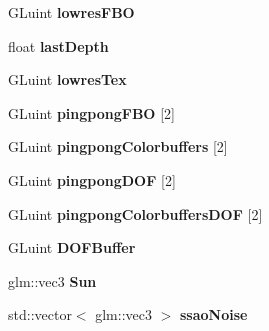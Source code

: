 \begin{DoxyCompactItemize}
\item 
G\+Luint {\bfseries lowres\+F\+BO}\hypertarget{class_post_process_a49a53d8a3ea6bd18eb455fe52de5dda2}{}\label{class_post_process_a49a53d8a3ea6bd18eb455fe52de5dda2}

\item 
float {\bfseries last\+Depth}\hypertarget{class_post_process_a3abc05d2892f0bfd536252612ce69e24}{}\label{class_post_process_a3abc05d2892f0bfd536252612ce69e24}

\item 
G\+Luint {\bfseries lowres\+Tex}\hypertarget{class_post_process_ae680a89b400e4530f570f74fc8b48b65}{}\label{class_post_process_ae680a89b400e4530f570f74fc8b48b65}

\item 
G\+Luint {\bfseries pingpong\+F\+BO} \mbox{[}2\mbox{]}\hypertarget{class_post_process_a2adb4ea7ba61d31a0facac5f69b062bc}{}\label{class_post_process_a2adb4ea7ba61d31a0facac5f69b062bc}

\item 
G\+Luint {\bfseries pingpong\+Colorbuffers} \mbox{[}2\mbox{]}\hypertarget{class_post_process_a7118702a4e3ccab9694a0754aa778c0e}{}\label{class_post_process_a7118702a4e3ccab9694a0754aa778c0e}

\item 
G\+Luint {\bfseries pingpong\+D\+OF} \mbox{[}2\mbox{]}\hypertarget{class_post_process_a0bb0221084bd5c1e1455b32489dddc05}{}\label{class_post_process_a0bb0221084bd5c1e1455b32489dddc05}

\item 
G\+Luint {\bfseries pingpong\+Colorbuffers\+D\+OF} \mbox{[}2\mbox{]}\hypertarget{class_post_process_a7aa3bb2fca1e8ef8a877a4f06316aea8}{}\label{class_post_process_a7aa3bb2fca1e8ef8a877a4f06316aea8}

\item 
G\+Luint {\bfseries D\+O\+F\+Buffer}\hypertarget{class_post_process_a443ab6ff49c01a284eff21cf51a0b6b7}{}\label{class_post_process_a443ab6ff49c01a284eff21cf51a0b6b7}

\item 
glm\+::vec3 {\bfseries Sun}\hypertarget{class_post_process_a0d4bc1dee1128ff4e35cb2504f891780}{}\label{class_post_process_a0d4bc1dee1128ff4e35cb2504f891780}

\item 
std\+::vector$<$ glm\+::vec3 $>$ {\bfseries ssao\+Noise}\hypertarget{class_post_process_a373cf87c4afb93b26bbad09882f609a3}{}\label{class_post_process_a373cf87c4afb93b26bbad09882f609a3}


\end{DoxyCompactItemize}
